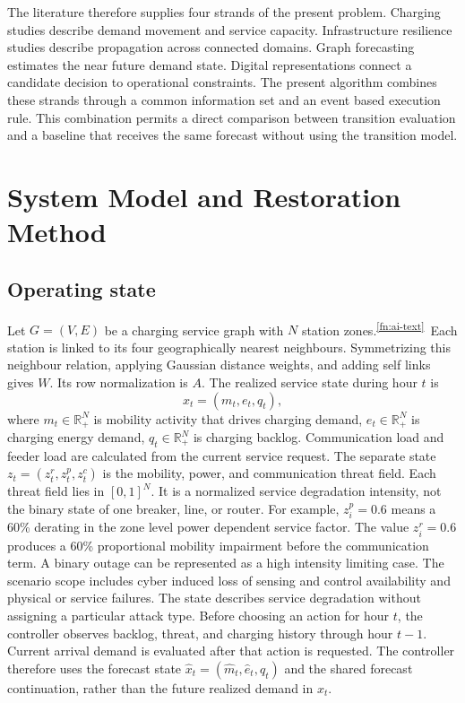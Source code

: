 \documentclass[journal]{IEEEtran}
\newcommand{\AITextRef}{\textsuperscript{\ref{fn:ai-text}}}
\begin{document}
The literature therefore supplies four strands of the present problem.
Charging studies describe demand movement and service capacity.  Infrastructure
resilience studies describe propagation across connected domains.  Graph
forecasting estimates the near future demand state.  Digital representations
connect a candidate decision to operational constraints.  The present
algorithm combines these strands through a common information set and an
event based execution rule.  This combination permits a direct comparison
between transition evaluation and a baseline that receives the same forecast
without using the transition model.

\section{System Model and Restoration Method}
\label{sec:method}

\subsection{Operating state}
\label{sec:state}

Let $G=(V,E)$ be a charging service graph with $N$ station zones.\AITextRef\ Each station
is linked to its four geographically nearest neighbours.  Symmetrizing this
neighbour relation, applying Gaussian distance weights, and adding self links
gives $W$.  Its row normalization is $A$.  The realized service state during
hour $t$ is
\begin{equation}
x_t=(m_t,e_t,q_t),
\end{equation}
where $m_t\in\mathbb{R}_+^N$ is mobility activity that drives charging demand,
$e_t\in\mathbb{R}_+^N$ is charging energy demand, $q_t\in\mathbb{R}_+^N$ is
charging backlog.  Communication load and feeder load are calculated from the
current service request.  The separate state $z_t=(z_t^r,z_t^p,z_t^c)$ is the
mobility, power, and communication threat field.  Each threat field lies in
$[0,1]^N$.  It is a normalized service degradation intensity, not the binary
state of one breaker, line, or router.  For example, $z_i^p=0.6$ means a 60\%
derating in the zone level power dependent service factor.  The value
$z_i^r=0.6$ produces
a 60\% proportional mobility impairment before the communication term.  A
binary outage can be represented as a high intensity limiting case.  The
scenario scope includes cyber induced loss of sensing and control availability and
physical or service failures.  The state describes service degradation without
assigning a particular attack type.  Before choosing an action for hour $t$,
the controller observes backlog, threat, and charging history through hour
$t-1$.  Current arrival demand is evaluated after that action is requested.
The controller therefore uses the forecast state
$\hat x_t=(\hat m_t,\hat e_t,q_t)$ and the shared forecast continuation, rather
than the future realized demand in $x_t$.
\end{document}
